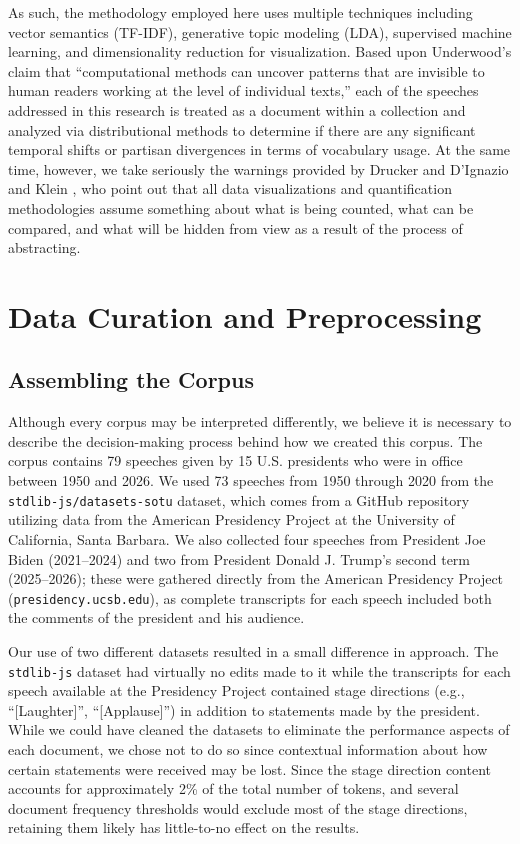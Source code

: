 \documentclass[11pt,twocolumn]{article}
\begin{document}
As such, the methodology employed here uses multiple techniques including vector semantics (TF-IDF), generative topic modeling (LDA), supervised machine learning, and dimensionality reduction for visualization. Based upon Underwood's \citeyearpar{underwood2019} claim that ``computational methods can uncover patterns that are invisible to human readers working at the level of individual texts,'' each of the speeches addressed in this research is treated as a document within a collection and analyzed via distributional methods to determine if there are any significant temporal shifts or partisan divergences in terms of vocabulary usage. At the same time, however, we take seriously the warnings provided by Drucker \citeyearpar{drucker2017} and D'Ignazio and Klein \citeyearpar{dignazio2020}, who point out that all data visualizations and quantification methodologies assume something about what is being counted, what can be compared, and what will be hidden from view as a result of the process of abstracting.

\section{Data Curation and Preprocessing}

\subsection{Assembling the Corpus}

Although every corpus may be interpreted differently, we believe it is necessary to describe the decision-making process behind how we created this corpus. The corpus contains 79 speeches given by 15 U.S. presidents who were in office between 1950 and 2026. We used 73 speeches from 1950 through 2020 from the \texttt{stdlib-js/datasets-sotu} dataset, which comes from a GitHub repository utilizing data from the American Presidency Project at the University of California, Santa Barbara. We also collected four speeches from President Joe Biden (2021--2024) and two from President Donald J. Trump's second term (2025--2026); these were gathered directly from the American Presidency Project (\texttt{presidency.ucsb.edu}), as complete transcripts for each speech included both the comments of the president and his audience.

Our use of two different datasets resulted in a small difference in approach. The \texttt{stdlib-js} dataset had virtually no edits made to it while the transcripts for each speech available at the Presidency Project contained stage directions (e.g., ``[Laughter]'', ``[Applause]'') in addition to statements made by the president. While we could have cleaned the datasets to eliminate the performance aspects of each document, we chose not to do so since contextual information about how certain statements were received may be lost. Since the stage direction content accounts for approximately 2\% of the total number of tokens, and several document frequency thresholds would exclude most of the stage directions, retaining them likely has little-to-no effect on the results.
\end{document}
